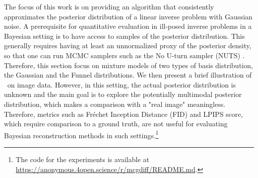 \label{sec:numerics}
The focus of this work is on providing an algorithm that consistently approximates the posterior distribution of a linear inverse problem with Gaussian noise.
A prerequisite for quantitative evaluation in ill-posed inverse problems in a Bayesian setting is to have access to samples of the posterior distribution.
This generally requires having at least an unnormalized proxy of the posterior density, so that one can run MCMC samplers such as the No U-turn sampler (NUTS) \cite{Hoffman2011}.
Therefore, this section focus on mixture models of two types of basis distribution, the Gaussian and the Funnel distributions.
We then present a brief illustration of \algo\ on image data. However, in this setting, the actual posterior distribution is unknown and the main goal is to explore the potentially multimodal posterior distribution, which makes a comparison with a "real image" meaningless.
Therefore, metrics such as Fréchet Inception Distance (FID) and LPIPS score, which require comparison to a ground truth, are not useful for evaluating Bayesian reconstruction methods in such settings.\footnote{The code for the experiments is available at \url{https://anonymous.4open.science/r/mcgdiff/README.md}.}
